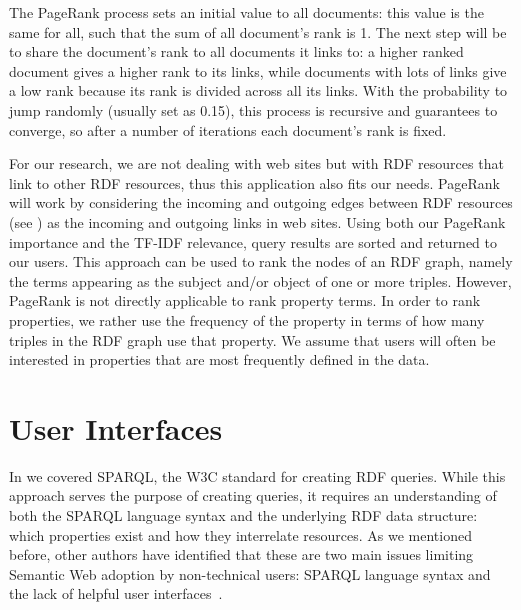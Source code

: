 The PageRank process sets an initial value to all documents: this value is the same for all, such that the sum of all document’s rank is 1. The next step will be to share the document's rank to all documents it links to: a higher ranked document gives a higher rank to its links, while documents with lots of links give a low rank because its rank is divided across all its links. With the probability to jump randomly (usually set as 0.15), this process is recursive and guarantees to converge, so after a number of iterations each document’s rank is fixed.

For our research, we are not dealing with web sites but with RDF resources that link to other RDF resources, thus this application also fits our needs. PageRank will work by considering the incoming and outgoing edges between RDF resources (see ) as the incoming and outgoing links in web sites. Using both our PageRank importance and the TF-IDF relevance, query results are sorted and returned to our users. This approach can be used to rank the nodes of an RDF graph, namely the terms appearing as the subject and/or object of one or more triples. However, PageRank is not directly applicable to rank property terms. In order to rank properties, we rather use the frequency of the property in terms of how many triples in the RDF graph use that property. We assume that users will often be interested in properties that are most frequently defined in the data.


\section{User Interfaces}

In  we covered SPARQL, the W3C standard for creating RDF queries. While this approach serves the purpose of creating queries, it requires an understanding of both the SPARQL language syntax and the underlying RDF data structure: which properties exist and how they interrelate resources. As we mentioned before, other authors have identified that these are two main issues limiting Semantic Web adoption by non-technical users: SPARQL language syntax and the lack of helpful user interfaces~\cite{Ferre2016, Lehmann2014, Unger2014}.

